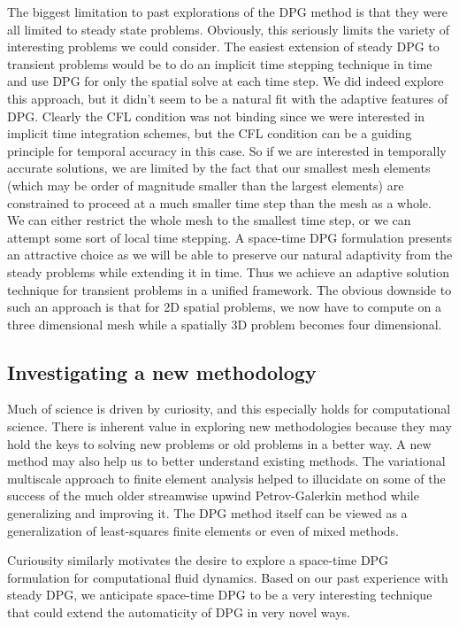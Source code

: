 \documentclass[12pt]{report}
\begin{document}
The biggest limitation to past explorations of the DPG method is that they were all limited to steady state problems.
Obviously, this seriously limits the variety of interesting problems we could consider. 
The easiest extension of steady DPG to transient problems would be to do an implicit time stepping technique in time and use DPG for only the spatial solve at each time step.
We did indeed explore this approach, but it didn't seem to be a natural fit with the adaptive features of DPG.
Clearly the CFL condition was not binding since we were interested in implicit time integration schemes, but the CFL condition can be a guiding principle for temporal accuracy in this case.
So if we are interested in temporally accurate solutions, we are limited by the fact that our smallest mesh elements (which may be order of magnitude smaller than the largest elements) are constrained to proceed at a much smaller time step than the mesh as a whole. 
We can either restrict the whole mesh to the smallest time step, or we can attempt some sort of local time stepping.
A space-time DPG formulation presents an attractive choice as we will be able to preserve our natural adaptivity from the steady problems while extending it in time.
Thus we achieve an adaptive solution technique for transient problems in a unified framework.
The obvious downside to such an approach is that for 2D spatial problems, we now have to compute on a three dimensional mesh while a spatially 3D problem becomes four dimensional.

\subsection{Investigating a new methodology}
Much of science is driven by curiosity, and this especially holds for computational science. 
There is inherent value in exploring new methodologies because they may hold the keys to solving new problems or old problems in a better way.
A new method may also help us to better understand existing methods. 
The variational multiscale approach to finite element analysis helped to illucidate on some of the success of the much older streamwise upwind Petrov-Galerkin method while generalizing and improving it.
The DPG method itself can be viewed as a generalization of least-squares finite elements or even of mixed methods. 

Curiousity similarly motivates the desire to explore a space-time DPG formulation for computational fluid dynamics. 
Based on our past experience with steady DPG, we anticipate space-time DPG to be a very interesting technique that could extend the automaticity of DPG in very novel ways.
\end{document}
